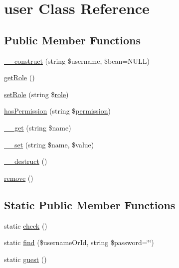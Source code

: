 \hypertarget{classcommon_1_1user_1_1user}{\section{user \-Class \-Reference}
\label{classcommon_1_1user_1_1user}
}
\subsection*{\-Public \-Member \-Functions}
\begin{DoxyCompactItemize}
\item 
\hyperlink{classcommon_1_1user_1_1user_a23e72c446cb3946f437c096da49c0771}{\-\_\-\-\_\-construct} (string \$username, \$bean=\-N\-U\-L\-L)
\item 
\hyperlink{classcommon_1_1user_1_1user_a0b2e7098f1c48a7439a42bada5b69689}{get\-Role} ()
\item 
\hyperlink{classcommon_1_1user_1_1user_a693ce7b594330a057ff5e70434a532ac}{set\-Role} (string \$\hyperlink{classcommon_1_1user_1_1role}{role})
\item 
\hyperlink{classcommon_1_1user_1_1user_a3b22cd89cfbe4b444fdfd54c11f217d2}{has\-Permission} (string \$\hyperlink{classcommon_1_1user_1_1permission}{permission})
\item 
\hyperlink{classcommon_1_1user_1_1user_a0acd7052f38245fd3723ea29c83bf3f3}{\-\_\-\-\_\-get} (string \$name)
\item 
\hyperlink{classcommon_1_1user_1_1user_a2c4e9c30cf213decde815cdcb37e1ac8}{\-\_\-\-\_\-set} (string \$name, \$value)
\item 
\hyperlink{classcommon_1_1user_1_1user_a421831a265621325e1fdd19aace0c758}{\-\_\-\-\_\-destruct} ()
\item 
\hyperlink{classcommon_1_1user_1_1user_aff9a1fb07dca963c2c9a8ffe66b45ded}{remove} ()
\end{DoxyCompactItemize}
\subsection*{\-Static \-Public \-Member \-Functions}
\begin{DoxyCompactItemize}
\item 
static \hyperlink{classcommon_1_1user_1_1user_a3a934bd1e982502106ee5dfac2e4e2ed}{check} ()
\item 
static \hyperlink{classcommon_1_1user_1_1user_a60cee38002f8c7486c144fac39fa1b70}{find} (\$username\-Or\-Id, string \$password=\char`\"{}\char`\"{})
\item 
static \hyperlink{classcommon_1_1user_1_1user_add24390720d880435ddea36f244998c7}{guest} ()
\end{DoxyCompactItemize}
